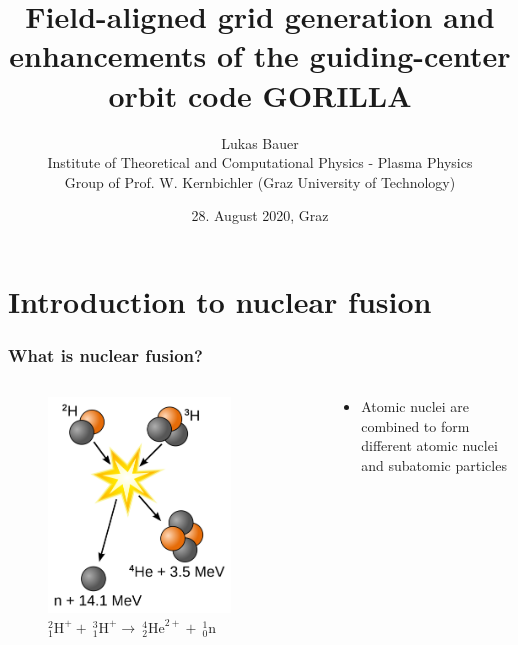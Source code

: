 \documentclass{beamer}
\title[]
{Field-aligned grid generation and \\
enhancements of the guiding-center \\
orbit code GORILLA}
\author[L.~Bauer]{\scriptsize Lukas Bauer\\
	Institute of Theoretical and Computational Physics - Plasma Physics\\Group of Prof. W. Kernbichler (Graz University of Technology)
}
\date{28. August 2020, Graz} %
\institute[Institute of Theoretical and Computational Physics]
{
}
\begin{document}
\titleframe


\section{Introduction to nuclear fusion}

\begin{frame}
	\frametitle{What is nuclear fusion?}
	\vspace{-1 cm}
	\begin{columns}[onlytextwidth]
		\begin{column}{0.45\textwidth}
			\begin{center}
					\begin{figure}
				\includegraphics[trim={0 0 0 2cm},clip,width=0.8\textwidth]{FIGURES/Deuterium-tritium_fusion.png}
				\caption{ $^2_1\text{H}^+ +~ ^3_1\text{H}^+	\rightarrow ~ ^4_2\text{He}^{2+} +~ ^1_0\text{n}$}
					\end{figure}
			\end{center}
		\end{column}
		\begin{column}{0.45\textwidth}
			\begin{center}
				\begin{itemize}
					\item Atomic nuclei are combined to form different atomic nuclei and subatomic particles\\

\end{itemize}
\end{center}
\end{column}
\end{columns}
\end{frame}
\end{document}

